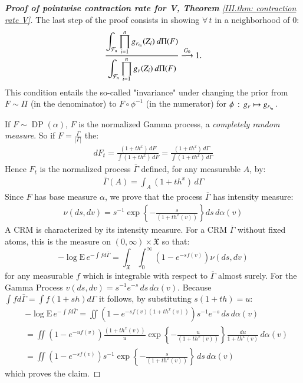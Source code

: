 \begin{proof}[\hypertarget{III.proof contraction pointwise V}{\textbf{Proof of pointwise contraction rate for V, Theorem} \ref{III.thm: contraction rate V}}]
    The last step of the proof consists in showing $\forall \, t$ in a neighborhood of $0$:
    \begin{align}\label{III.eq: invariance measure condition}
        \ddfrac{\int_{\mathcal{F}_n} \prod_{i=1}^n g_{\scriptscriptstyle{F_{\scaleto{t_n}{3.5pt}}}}(Z_i) \: d \Pi(F)}{\int_{\mathcal{F}_n} \prod_{i=1}^n g_{\scriptscriptstyle{F}}(Z_i) \: d \Pi(F)} \stackrel{G_0}{\longrightarrow} 1.
    \end{align}
    This condition entails the so-called "invariance" under changing the prior from $F \sim \Pi$ (in the denominator) to $F \circ \phi^{-1}$ (in the numerator) for $\phi \, : \, g_{\scriptscriptstyle{F}} \mapsto g_{\scriptscriptstyle{F_{\scaleto{t_n}{3.5pt}}}}$.

    If $F \sim \operatorname{DP}(\alpha)$, $F$ is the normalized Gamma process, a \textit{completely random measure}. So if $F = \frac{\Gamma}{|\Gamma|}$ the:
    \begin{align}\label{III.eq: perturbation as crm}
        dF_t = \frac{(1+th^x) \, dF}{\int (1+th^x) \, dF} = \frac{(1+th^x) \, d \Gamma}{\int (1+th^x) \, d \Gamma} 
    \end{align}
    Hence $F_t$ is the normalized process $\overline{\Gamma}$ defined, for any measurable $A$, by:
    \begin{align*}
        \overline{\Gamma}(A) = \int_A (1+th^x) \, d \Gamma
    \end{align*}
    Since $F$ has base measure $\alpha$, we prove that the process $\overline{\Gamma}$ has intensity measure:
    \begin{align*}
        \nu (d s, dv)=s^{-1} \exp \left\{-\frac{s}{(1+t h^x(v))} \right\} d s \, d \alpha(v)
    \end{align*}
    A CRM is characterized by its intensity measure. For a CRM $\overline{\Gamma}$ without fixed atoms, this is the measure on $(0, \infty) \times \mathfrak{X}$ so that:
    $$
    -\log \mathrm{E} \, e^{-\int f d \overline{\Gamma}}=\int_{\mathfrak{X}} \int_0^{\infty}\left(1-e^{-s f(v)}\right) \nu (d s, d v)
    $$
    for any measurable $f$ which is integrable with respect to $\overline{\Gamma}$ almost surely.
    For the Gamma Process $v(d s, d v)=s^{-1} e^{-s} \, d s \, d \alpha(v)$. Because $\int f d \bar{\Gamma}=\int f(1+s h) d \Gamma$ it follows, by substituting $s(1+t h)=u$:
    \begin{align*}
    &-\log \mathrm{E} \, e^{-\int f d \bar{\Gamma}}=\iint\left(1-e^{-s f(v)(1+t h^x(v))}\right) s^{-1} e^{-s} \,  d s \, d \alpha(v) \\
    & =\iint\left(1-e^{-u f(v)}\right) \frac{(1+t h^x(v))}{u} \exp{\left\{-\frac{u}{(1+th^x(v))} \right\} } \frac{d u}{1+t h^x(v)} \,  d \alpha(v) \\
    & =\iint\left(1-e^{-s f(v)}\right) s^{-1} \exp{\left\{-\frac{s}{(1+th^x(v))} \right\} } \, d s \, d \alpha(v)
    \end{align*}
    which proves the claim.


\end{proof}
